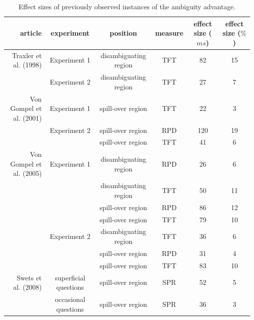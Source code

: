 \documentclass[english, doc]{apa7}\usepackage[]{graphicx}\usepackage[]{color}
\begin{document}
{\color{red}
\begin{table}[]
    \caption{Effect sizes of previously observed instances of the ambiguity advantage.}
    \label{tab:effect_sizes}
    \centering
    \hspace*{-1cm}
    \begin{tabular}{r|c|c|c|c|c}
        \hline
        article & experiment & position & measure & \thead{effect size\\($ms$)} & \thead{effect size\\($\%$)} \\
        \hline
         Traxler et al. (1998) & Experiment 1 & disambiguating region & TFT & 82  & 15 \\ %
                               & Experiment 2 & disambiguating region & TFT & 27  & 7 \\
         Von Gompel et al. (2001) & Experiment 1 & spill-over region & TFT & 22  & 3 \\
                                  & Experiment 2 & spill-over region & RPD & 120 & 19 \\
                                  &              & spill-over region & TFT & 41  & 6 \\
         Von Gompel et al. (2005) & Experiment 1 & disambiguating region & RPD & 26  & 6 \\
                                  &              & disambiguating region & TFT & 50  & 11 \\
                                  &              & spill-over region     & RPD & 86  & 12 \\
                                  &              & spill-over region     & TFT & 79  & 10 \\
                                  & Experiment 2 & disambiguating region & TFT & 36  & 6 \\
                                  &              & spill-over region     & RPD & 31  & 4 \\
                                  &              & spill-over region     & TFT & 83  & 10 \\
         Swets et al. (2008)   & superficial questions & spill-over region & SPR & 52  & 5 \\
                               & occasional questions & spill-over region & SPR & 36  & 3 \\
        \hline
    \end{tabular}
\end{table}
}
\end{document}
